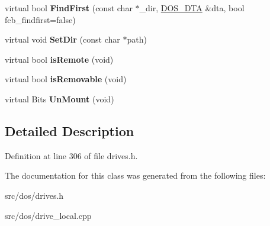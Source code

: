 \begin{DoxyCompactItemize}
\item 
\hypertarget{classcdromDrive_afd0347b272659c24f6f3cd9b7b05f89c}{virtual bool {\bfseries Find\-First} (const char $\ast$\-\_\-dir, \hyperlink{classDOS__DTA}{D\-O\-S\-\_\-\-D\-T\-A} \&dta, bool fcb\-\_\-findfirst=false)}\label{classcdromDrive_afd0347b272659c24f6f3cd9b7b05f89c}

\item 
\hypertarget{classcdromDrive_a3aeeb35dbd5100a4b973aa6341295521}{virtual void {\bfseries Set\-Dir} (const char $\ast$path)}\label{classcdromDrive_a3aeeb35dbd5100a4b973aa6341295521}

\item 
\hypertarget{classcdromDrive_a2186d681041aad9456c57cd4be5cc0bc}{virtual bool {\bfseries is\-Remote} (void)}\label{classcdromDrive_a2186d681041aad9456c57cd4be5cc0bc}

\item 
\hypertarget{classcdromDrive_ab96402d6d61617f26d545268e1127a07}{virtual bool {\bfseries is\-Removable} (void)}\label{classcdromDrive_ab96402d6d61617f26d545268e1127a07}

\item 
\hypertarget{classcdromDrive_a4e5d16dc2a6171b622ed815b464f1114}{virtual Bits {\bfseries Un\-Mount} (void)}\label{classcdromDrive_a4e5d16dc2a6171b622ed815b464f1114}

\end{DoxyCompactItemize}


\subsection{Detailed Description}


Definition at line 306 of file drives.\-h.



The documentation for this class was generated from the following files\-:\begin{DoxyCompactItemize}
\item 
src/dos/drives.\-h\item 
src/dos/drive\-\_\-local.\-cpp\end{DoxyCompactItemize}
